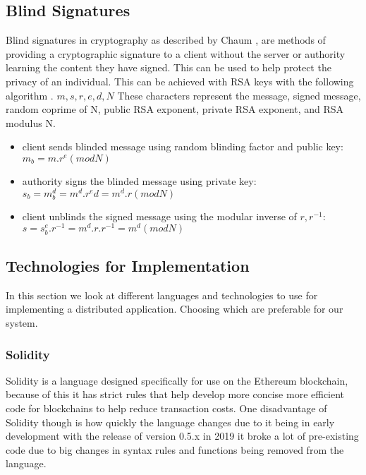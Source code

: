 \documentclass{entcs}
\begin{document}

\subsection{Blind Signatures}
Blind signatures in cryptography as described by Chaum \cite{chaum1983blind}, are methods of providing a cryptographic signature to a client without the server or authority learning the content they have signed. This can be used to help protect the privacy of an individual. This can be achieved with RSA keys with the following algorithm \cite{MITcrypto}.
\(m, s, r, e, d, N\) These characters represent the message, signed message, random coprime of N, public RSA exponent, private RSA exponent, and RSA modulus N.
\begin{itemize}
    \item client sends blinded message using random blinding factor and public key: \\
    \(m_b = m.r^e (mod N)\)
    \item authority signs the blinded message using private key: \\
    \(s_b = m^d_b = m^d.r^ed = m^d.r (mod N)\)
    \item client unblinds the signed message using the modular inverse of \(r, r^{-1}\): \\
    \(s = s^e_b.r^{-1} = m^d.r.r^{-1} = m^d (mod N)\)
\end{itemize}

\subsection{Technologies for Implementation}
In this section we look at different languages and technologies to use for implementing a distributed application. Choosing which are preferable for our system.


\subsubsection{Solidity}
Solidity is a language designed specifically for use on the Ethereum blockchain, because of this it has strict rules that help develop more concise more efficient code for blockchains to help reduce transaction costs. One disadvantage of Solidity though is how quickly the language changes due to it being in early development with the release of version 0.5.x in 2019 it broke a lot of pre-existing code due to big changes in syntax rules and functions being removed from the language.
\end{document}
